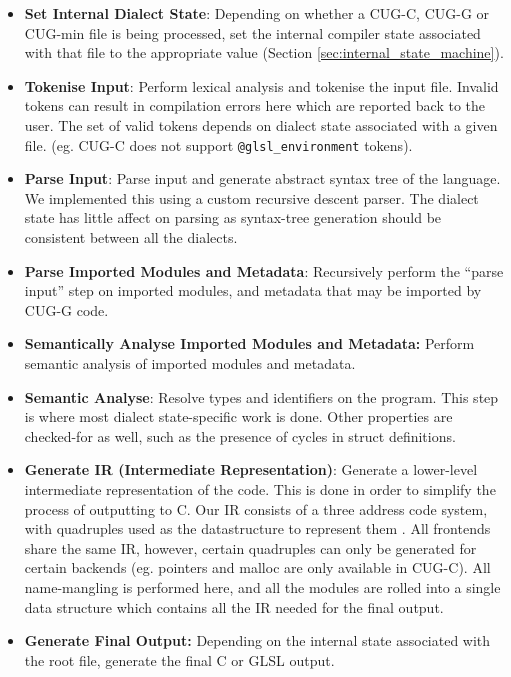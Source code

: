 \documentclass[a4paper,12pt,twoside,openright]{report}
\begin{document}
\begin{itemize}

    \item \textbf{Set Internal Dialect State}: Depending on whether a CUG-C,
    CUG-G or CUG-min file is being processed, set the internal compiler state
    associated with that file to the appropriate value (Section
    \ref{sec:internal_state_machine}).

    \item \textbf{Tokenise Input}: Perform lexical analysis and tokenise the
    input file. Invalid tokens can result in compilation errors here which are
    reported back to the user. The set of valid tokens depends on dialect state
    associated with a given file. (eg. CUG-C does not support
    \texttt{@glsl\_environment} tokens).

    \item \textbf{Parse Input}: Parse input and generate abstract syntax tree
    of the language. We implemented this using a custom recursive descent
    parser. The dialect state has little affect on parsing as syntax-tree
    generation should be consistent between all the dialects.

    \item \textbf{Parse Imported Modules and Metadata}: Recursively perform the
    ``parse input'' step on imported modules, and metadata that may be imported
    by CUG-G code.

    \item \textbf{Semantically Analyse Imported Modules and Metadata:} Perform
    semantic analysis of imported modules and metadata.

    \item \textbf{Semantic Analyse}: Resolve types and identifiers on the
    program. This step is where most dialect state-specific work is done. Other
    properties are checked-for as well, such as the presence of cycles in
    struct definitions.

    \item \textbf{Generate IR (Intermediate Representation)}: Generate a
    lower-level intermediate representation of the code. This is done in order
    to simplify the process of outputting to C. Our IR consists of a three
    address code system, with quadruples used as the datastructure to represent
    them \cite{TODO}. All frontends share the same IR, however, certain
    quadruples can only be generated for certain backends (eg. pointers and
    malloc are only available in CUG-C). All name-mangling is performed here,
    and all the modules are rolled into a single data structure which contains
    all the IR needed for the final output.

    \item \textbf{Generate Final Output:} Depending on the internal state
    associated with the root file, generate the final C or GLSL output.

\end{itemize}
\end{document}
